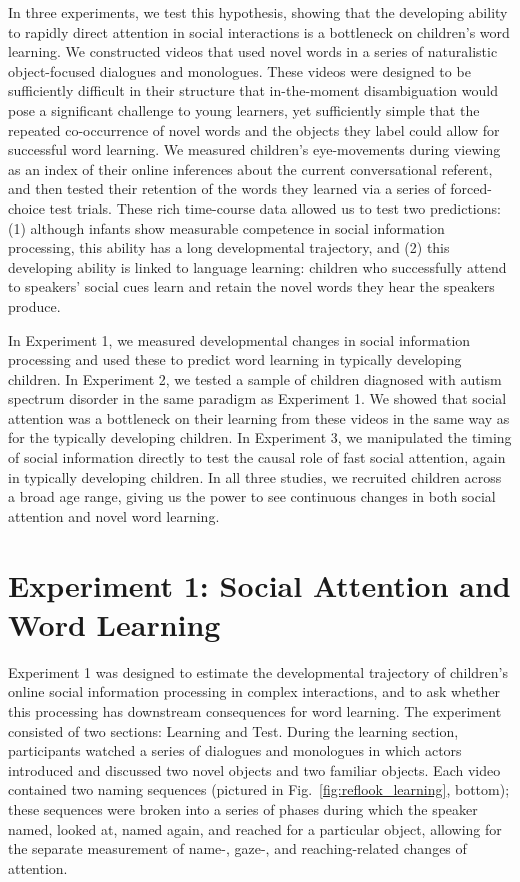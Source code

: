 \documentclass{pnastwo}
\begin{document}
\begin{article}
In three experiments, we test this hypothesis, showing that the developing ability to rapidly direct attention in social interactions is a bottleneck on children's word learning. We constructed videos that used novel words in a series of naturalistic object-focused dialogues and monologues. These videos were designed to be sufficiently difficult in their structure that in-the-moment disambiguation would pose a significant challenge to young learners, yet sufficiently simple that the repeated co-occurrence of novel words and the objects they label could allow for successful word learning. We measured children's eye-movements during viewing as an index of their online inferences about the current conversational referent, and then tested their retention of the words they learned via a series of forced-choice test trials. These rich time-course data allowed us to test two predictions: (1) although infants show measurable competence in social information processing, this ability has a long developmental trajectory, and (2) this developing ability is linked to language learning: children who successfully attend to speakers' social cues learn and retain the novel words they hear the speakers produce.

In Experiment 1, we measured developmental changes in social information processing and used these to predict word learning in typically developing children. In Experiment 2, we tested a sample of children diagnosed with autism spectrum disorder in the same paradigm as Experiment 1. We showed that social attention was a bottleneck on their learning from these videos in the same way as for the typically developing children. In Experiment 3, we manipulated the timing of social information directly to test the causal role of fast social attention, again in typically developing children. In all three studies, we recruited children across a broad age range, giving us the power to see continuous changes in both social attention and novel word learning.

\section{Experiment 1: Social Attention and Word Learning}

Experiment 1 was designed to estimate the developmental trajectory of children's online social information processing in complex interactions, and to ask whether this processing has downstream consequences for word learning. The experiment consisted of two sections: Learning and Test. During the learning section, participants watched a series of dialogues and monologues in which actors introduced and discussed two novel objects and two familiar objects. Each video contained two naming sequences (pictured in Fig.~\ref{fig:reflook_learning}, bottom); these sequences were broken into a series of phases during which the speaker named, looked at, named again, and reached for a particular object, allowing for the separate measurement of name-, gaze-, and reaching-related changes of attention.


\end{article}
\end{document}
